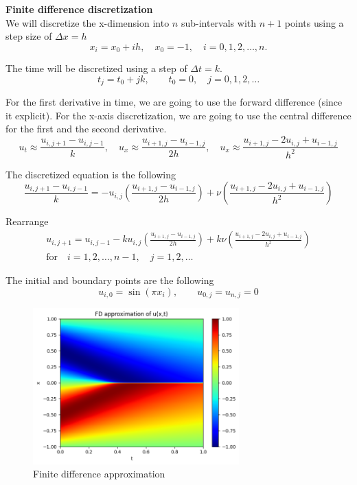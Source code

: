 \documentclass[a4paper, onecolumn, 12pt]{article}
\begin{document}
\textbf{Finite difference discretization}\\
We will discretize the x-dimension into $n$ sub-intervals with $n+1$ points using a step size of $\Delta x = h$
$$
x_i = x_0 + ih, \quad x_0 = -1, \quad i = 0, 1, 2, \dots, n.
$$  

The time will be discretized using a step of $\Delta t = k$.
$$
t_j = t_0 + jk, \qquad t_0 = 0, \quad j = 0, 1, 2, \dots
$$

For the first derivative in time, we are going to use the forward difference (since it explicit). 
For the x-axis discretization, we are going to use the central difference for the first and the second derivative.
$$
u_t \approx \frac{u_{i,j+1} - u_{i, j-1}}{k}, \quad
u_x \approx \frac{ u_{i+1,j} - u_{i-1,j} }{2h}, \quad
u_x \approx \frac{ u_{i+1,j} - 2 u_{i,j} + u_{i-1,j} }{h^2}
$$

The discretized equation is the following
\begin{equation}
\frac{u_{i,j+1} - u_{i, j-1}}{k} =
- u_{i,j} \left( \frac{ u_{i+1,j} - u_{i-1,j} }{2h} \right)
+ \nu \left( \frac{ u_{i+1,j} - 2 u_{i,j} + u_{i-1,j} }{h^2} \right)
\end{equation}

Rearrange
\begin{multline}
u_{i,j+1}  = u_{i, j-1}
- k u_{i,j} \left( \frac{ u_{i+1,j} - u_{i-1,j} }{2h} \right)
+ k \nu \left( \frac{ u_{i+1,j} - 2 u_{i,j} + u_{i-1,j} }{h^2} \right)
\\ \text{for} \quad i=1, 2, \dots, n-1,  \quad j = 1, 2, \dots
\end{multline}

The initial and boundary points are the following
$$
u_{i,0} = \sin(\pi x_i), \qquad u_{0,j} = u_{n,j} = 0
$$

\begin{figure}
    \centering
    \includegraphics[width=300px]{images/FD_burgers_pde.png}
    \vspace{-1em}
    \caption{Finite difference approximation}
    \label{fd_burgers}
\end{figure}
\end{document}
